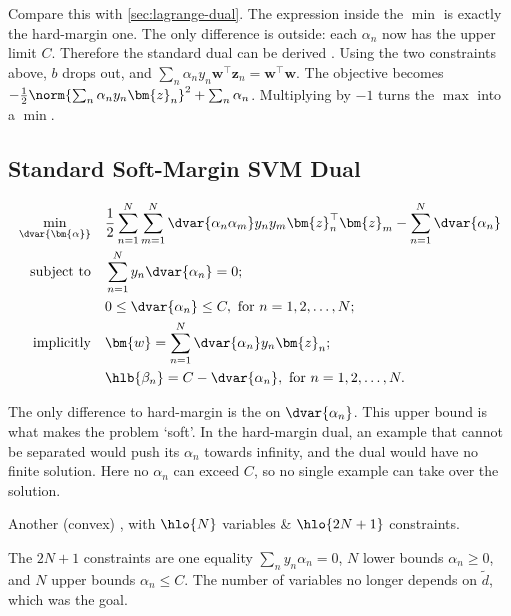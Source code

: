 Compare this with \autoref{sec:lagrange-dual}. The expression inside the
\(\min\) is exactly the hard-margin one. The only difference is outside: each
\(\alpha_n\) now has the upper limit \(C\). Therefore the standard dual can
be derived . Using
the two constraints above, \(b\) drops out, and \(\sum_n \alpha_n y_n
\bm{w}^\top \bm{z}_n = \bm{w}^\top \bm{w}\). The objective becomes
\(-\frac{1}{2} \norm{\sum_n \alpha_n y_n \bm{z}_n}^2 + \sum_n \alpha_n\).
Multiplying by \(-1\) turns the \(\max\) into a \(\min\).

\subsection{Standard Soft-Margin SVM Dual}

\begin{definition}
    \[
        \begin{aligned}
            \min_{\dvar{\bm{\alpha}}} \quad & \frac{1}{2} \sum_{n=1}^N
                \sum_{m=1}^N \dvar{\alpha_n \alpha_m} y_n y_m \bm{z}_n^\top
                \bm{z}_m - \sum_{n=1}^N \dvar{\alpha_n}\\
            \text{subject to} \quad & \sum_{n=1}^N y_n \dvar{\alpha_n} = 0;\\
            & 0 \le \dvar{\alpha_n} \le C, \text{ for } n = 1, 2, \dots ,
                N;\\
            \text{implicitly} \quad & \bm{w} = \sum_{n=1}^N \dvar{\alpha_n}
                y_n \bm{z}_n;\\
            & \hlb{\beta_n} = C - \dvar{\alpha_n}, \text{ for } n = 1, 2,
                \dots , N.
        \end{aligned}
    \]
\end{definition}

The only difference to hard-margin is the  on
\(\dvar{\alpha_n}\). This upper bound is what makes the problem `soft'. In
the hard-margin dual, an example that cannot be separated would push its
\(\alpha_n\) towards infinity, and the dual would have no finite solution.
Here no \(\alpha_n\) can exceed \(C\), so no single example can take over
the solution.

\begin{moral}
    Another (convex) , with \(\hlo{N}\) variables \&
    \(\hlo{2N + 1}\) constraints.
\end{moral}

The \(2N + 1\) constraints are one equality \(\sum_n y_n \alpha_n = 0\),
\(N\) lower bounds \(\alpha_n \ge 0\), and \(N\) upper bounds \(\alpha_n \le
C\). The number of variables no longer depends on \(\tilde{d}\), which was
the goal.

